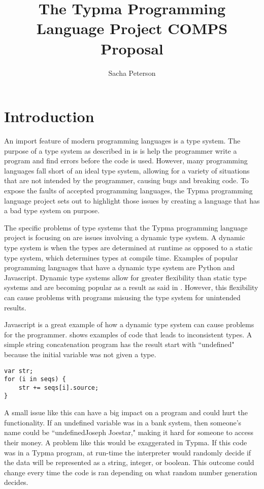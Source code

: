 \documentclass[10pt,twocolumn]{article}
\title{The Typma Programming Language Project COMPS Proposal}
\author{Sacha Peterson}
\affiliation{Occidental College}
\begin{document}
\maketitle

\section{Introduction}

An import feature of modern programming languages is a type system. The purpose of a type system as described in \textcite{Pierce2002Types} is is help the programmer write a program and find errors before the code is used. However, many programming languages fall short of an ideal type system, allowing for a variety of situations that are not intended by the programmer, causing bugs and breaking code. To expose the faults of accepted programming languages, the Typma programming language project sets out to highlight those issues by creating a language that has a bad type system on purpose.

The specific problems of type systems that the Typma programming language project is focusing on are issues involving a dynamic type system. A dynamic type system is when the types are determined at runtime as opposed to a static type system, which determines types at compile time. Examples of popular programming languages that have a dynamic type system are Python and Javascript. Dynamic type systems allow for greater flexibility than static type systems and are becoming popular as a result as said in \textcite{Pradel2014TypeDevil}. However, this flexibility can cause problems with programs misusing the type system for unintended results.

Javascript is a great example of how a dynamic type system can cause problems for the programmer. \textcite{Pradel2014TypeDevil} shows examples of code that leads to inconsistent types. A simple string concatenation program has the result start with ``undefined" because the initial variable was not given a type.

\begin{lstlisting}
var str;
for (i in seqs) {
	str += seqs[i].source;
}
\end{lstlisting}

A small issue like this can have a big impact on a program and could hurt the functionality. If an undefined variable was in a bank system, then someone's name could be ``undefinedJoseph Joestar," making it hard for someone to access their money. A problem like this would be exaggerated in Typma. If this code was in a Typma program, at run-time the interpreter would randomly decide if the data will be represented as a string, integer, or boolean. This outcome could change every time the code is ran depending on what random number generation decides.
\end{document}
